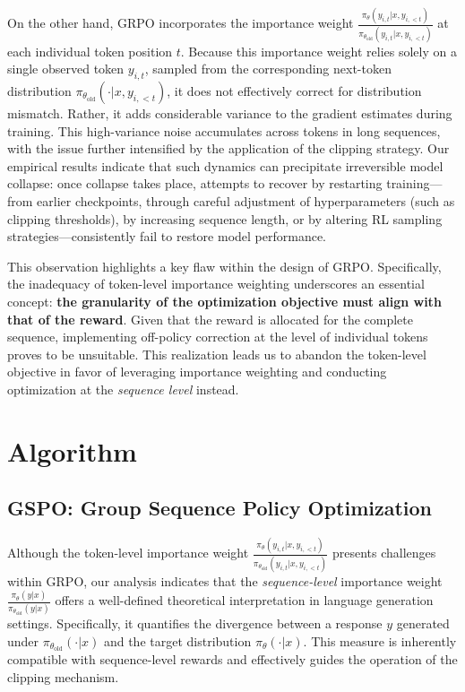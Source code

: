 On the other hand, GRPO incorporates the importance weight $\frac{ \pi_{\theta} (y_{i,t} | x, y_{i,<t}) }{ \pi_{\theta_\text{old}} (y_{i,t} | x,y_{i,<t})}$ at each individual token position $t$. Because this importance weight relies solely on a single observed token $y_{i,t}$, sampled from the corresponding next-token distribution $\pi_{\theta_\text{old}}( \cdot | x, y_{i,<t})$, it does not effectively correct for distribution mismatch. Rather, it adds considerable variance to the gradient estimates during training. This high-variance noise accumulates across tokens in long sequences, with the issue further intensified by the application of the clipping strategy. Our empirical results indicate that such dynamics can precipitate irreversible model collapse: once collapse takes place, attempts to recover by restarting training—from earlier checkpoints, through careful adjustment of hyperparameters (such as clipping thresholds), by increasing sequence length, or by altering RL sampling strategies—consistently fail to restore model performance.

This observation highlights a key flaw within the design of GRPO. Specifically, the inadequacy of token-level importance weighting underscores an essential concept: \textbf{the granularity of the optimization objective must align with that of the reward}. Given that the reward is allocated for the complete sequence, implementing off-policy correction at the level of individual tokens proves to be unsuitable. This realization leads us to abandon the token-level objective in favor of leveraging importance weighting and conducting optimization at the \textit{sequence level} instead.

\section{Algorithm}

\subsection{GSPO: Group Sequence Policy Optimization}

Although the token-level importance weight $\frac{ \pi_{\theta} (y_{i,t} | x, y_{i,<t}) }{ \pi_{\theta_\text{old}} (y_{i,t} | x,y_{i,<t})}$ presents challenges within GRPO, our analysis indicates that the \textit{sequence-level} importance weight $\frac{ \pi_{\theta} (y | x) }{ \pi_{\theta_\text{old}} (y | x)}$ offers a well-defined theoretical interpretation in language generation settings. Specifically, it quantifies the divergence between a response $y$ generated under $\pi_{\theta_\text{old}} (\cdot | x)$ and the target distribution $\pi_{\theta} (\cdot | x)$. This measure is inherently compatible with sequence-level rewards and effectively guides the operation of the clipping mechanism.

